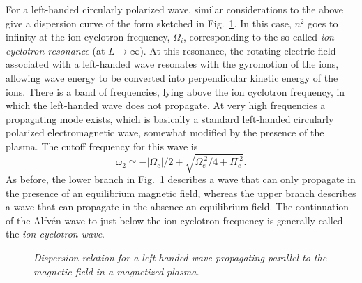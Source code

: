 For a left-handed circularly polarized wave, similar considerations 
to the above give a dispersion
curve of the form sketched in Fig.~\ref{f15}. In this case, $n^2$ goes to
infinity at the ion cyclotron frequency, ${\Omega}_i$, corresponding to
the so-called {\em ion cyclotron resonance}\/ (at $L\rightarrow\infty$). At this resonance, the
rotating  electric
field associated with a left-handed wave resonates with the gyromotion
of the ions, allowing wave energy to be converted into perpendicular kinetic
energy of the ions. There is a band of frequencies, lying above the ion cyclotron
frequency, in which the left-handed wave does not propagate. At very high
frequencies a propagating mode exists, which is basically a standard
left-handed circularly polarized electromagnetic wave, somewhat modified
by the presence of the plasma. The cutoff frequency for this wave is
\begin{equation}\label{e4.76}
\omega_2 \simeq	 -|{\Omega}_e|/2 + 
\sqrt{{\Omega}_e^{~2}/4 + {\Pi}_e^{~2}}.
\end{equation}
As before, the lower branch in Fig.~\ref{f15} describes a wave that can only propagate in the
presence of an equilibrium magnetic field, whereas the upper branch
describes a wave that 
can propagate in the absence  an equilibrium  field. The continuation of the
Alfv\'{e}n wave to just below the ion cyclotron frequency is 
generally called the
{\em ion cyclotron wave}.

\begin{figure}
\epsfysize=4in
\centerline{}
\caption{\em Dispersion relation for a left-handed wave propagating parallel
to the magnetic field in a magnetized plasma.}\label{f15}
\end{figure}

